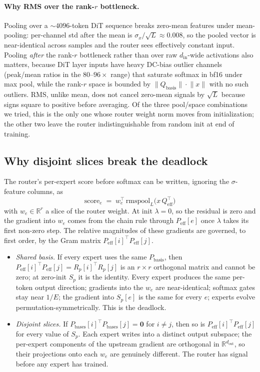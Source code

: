 \documentclass[10pt]{article}
\newcommand{\Rb}{\mathbb{R}}
\newcommand{\T}{^{\!\top}}
\newcommand{\Peff}{P_{\mathrm{eff}}}
\newcommand{\Qeff}{Q_{\mathrm{eff}}}
\newcommand{\Pbasis}{P_{\mathrm{basis}}}
\newcommand{\Qbasis}{Q_{\mathrm{basis}}}
\newcommand{\Pbases}{P_{\mathrm{bases}}}
\begin{document}
\paragraph{Why RMS over the rank-$r$ bottleneck.}
Pooling over a $\sim$$4096$-token DiT sequence breaks zero-mean
features under mean-pooling: per-channel std after the mean is
$\sigma_x / \sqrt{L} \approx 0.008$, so the pooled vector is
near-identical across samples and the router sees effectively
constant input. Pooling \emph{after} the rank-$r$ bottleneck rather
than over raw $d_{\mathrm{in}}$-wide activations also matters,
because DiT layer inputs have heavy DC-bias outlier channels (peak/mean
ratios in the $80$--$96\times$ range) that saturate softmax in bf16
under max pool, while the rank-$r$ space is bounded by
$\lVert\Qbasis\rVert\cdot\lVert x\rVert$ with no such outliers. RMS,
unlike mean, does not cancel zero-mean signals by $\sqrt{L}$ because
signs square to positive before averaging. Of the three pool/space
combinations we tried, this is the only one whose router weight norm
moves from initialization; the other two leave the router
indistinguishable from random init at end of training.

\subsection{Why disjoint slices break the deadlock}
\label{sec:deadlock-fix}

The router's per-expert score before softmax can be written, ignoring
the $\sigma$-feature columns, as
\[
\mathrm{score}_e \;=\; w_e\T \,\mathrm{rmspool}_L\bigl(x\,\Qeff\T\bigr)
\]
with $w_e \in \Rb^r$ a slice of the router weight. At init $\lambda
= 0$, so the residual is zero and the gradient into $w_e$ comes from
the chain rule through $\Peff[e]$ once $\lambda$ takes its first
non-zero step. The relative magnitudes of these gradients are
governed, to first order, by the Gram matrix $\Peff[i]\T \Peff[j]$.

\begin{itemize}[topsep=2pt,itemsep=0pt,leftmargin=1.2em]
\item \emph{Shared basis.} If every expert uses the same $\Pbasis$,
then $\Peff[i]\T \Peff[j] = R_p[i]\T R_p[j]$ is an $r\times r$
orthogonal matrix and cannot be zero; at zero-init $S_p$ it is the
identity. Every expert produces the same per-token output direction;
gradients into the $w_e$ are near-identical; softmax gates stay near
$1/E$; the gradient into $S_p[e]$ is the same for every $e$; experts
evolve permutation-symmetrically. This is the deadlock.

\item \emph{Disjoint slices.} If $\Pbases[i]\T \Pbases[j] =
\mathbf{0}$ for $i \neq j$, then so is $\Peff[i]\T \Peff[j]$ for
every value of $S_p$. Each expert writes into a distinct output
subspace; the per-expert components of the upstream gradient are
orthogonal in $\Rb^{d_{\mathrm{out}}}$, so their projections onto
each $w_e$ are genuinely different. The router has signal before any
expert has trained.
\end{itemize}
\end{document}
